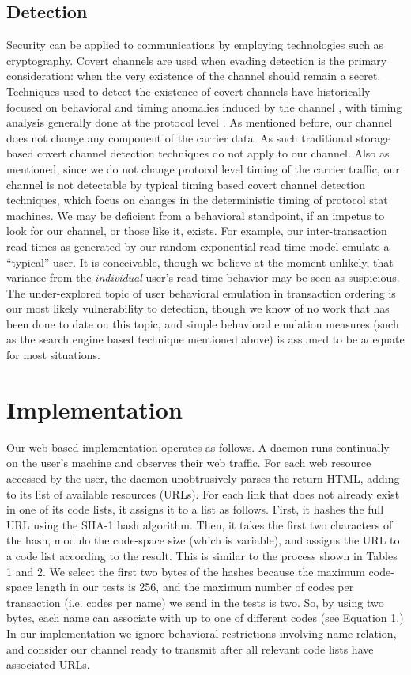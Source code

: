 \documentclass[10pt, conference]{IEEEtran}
\begin{document}
\subsection{Detection}
Security can be applied to communications by employing technologies such as cryptography.  Covert channels are used when evading detection is the primary consideration: when the very existence of the channel should remain a secret.  Techniques used to detect the existence of covert channels have historically focused on behavioral and timing anomalies induced by the channel \cite{Cabuk09} \cite{Goher12}, with timing analysis generally done at the protocol level \cite{Cabuk04} \cite{Gianvecchio11} \cite{Giles02} \cite{Luo08} \cite{Tumoian05}.  As mentioned before, our channel does not change any component of the carrier data.  As such traditional storage based covert channel detection techniques do not apply to our channel.  Also as mentioned, since we do not change protocol level timing of the carrier traffic, our channel is not detectable by typical timing based covert channel detection techniques, which focus on changes in the deterministic timing of protocol stat machines.  We may be deficient from a behavioral standpoint, if an impetus to look for our channel, or those like it, exists.  For example, our inter-transaction read-times as generated by our random-exponential read-time model emulate a ``typical'' user.  It is conceivable, though we believe at the moment unlikely, that variance from the {\em individual} user's read-time behavior may be seen as suspicious.  The under-explored topic of user behavioral emulation in transaction ordering is our most likely vulnerability to detection, though we know of no work that has been done to date on this topic, and simple behavioral emulation measures (such as the search engine based technique mentioned above) is assumed to be adequate for most situations.

\section{Implementation}

Our web-based implementation operates as follows.  A daemon runs continually on the user's machine and observes their web traffic.  For each web resource accessed by the user, the daemon unobtrusively parses the return HTML, adding to its list of available resources (URLs).  For each link that does not already exist in one of its code lists, it assigns it to a list as follows.  First, it hashes the full URL using the SHA-1 hash algorithm.  Then, it takes the first two characters of the hash, modulo the code-space size (which is variable), and assigns the URL to a code list according to the result.  This is similar to the process shown in Tables 1 and 2.  We select the first two bytes of the hashes because the maximum code-space length in our tests is 256, and the maximum number of codes per transaction (i.e. codes per name) we send in the tests is two.  So, by using two bytes, each name can associate with up to one of  different codes (see Equation 1.)  In our implementation we ignore behavioral restrictions involving name relation, and consider our channel ready to transmit after all relevant code lists have associated URLs.
\end{document}
